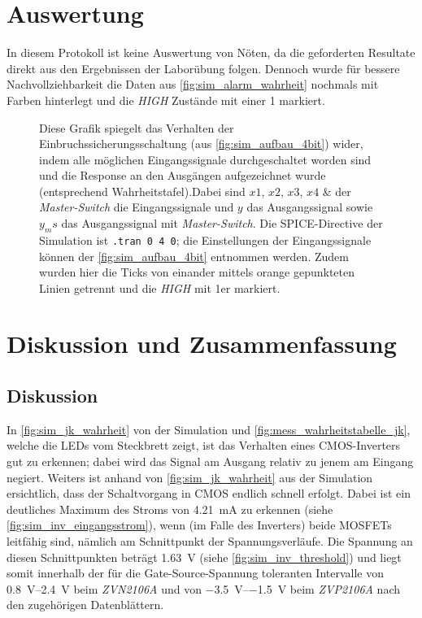 \documentclass[12pt,english,ngerman]{scrartcl}
\begin{document}
\section{Auswertung}\label{sec:Auswertung}
In diesem Protokoll ist keine Auswertung von Nöten, da die geforderten Resultate
direkt aus den Ergebnissen der Laborübung folgen. Dennoch wurde für bessere 
Nachvollziehbarkeit die Daten aus \autoref{fig:sim_alarm_wahrheit} nochmals mit Farben
hinterlegt und die \textit{HIGH} Zustände mit einer 1 markiert. 

\begin{figure}[H]
  \centering
  \caption{Diese Grafik spiegelt das Verhalten der
    Einbruchssicherungsschaltung (aus \autoref{fig:sim_aufbau_4bit}) wider, indem alle
    möglichen Eingangssignale durchgeschaltet worden sind und die Response an den
    Ausgängen aufgezeichnet wurde (entsprechend Wahrheitstafel).Dabei sind $x1$, $x2$, $x3$, $x4$ \&
    der \textit{Master-Switch} die Eingangssignale und $y$ das Ausgangssignal sowie $y_ms$
    das Ausgangssignal mit \textit{Master-Switch}. Die
    SPICE-Directive der Simulation ist \texttt{.tran 0 4 0}; die
    Einstellungen der Eingangssignale können der \autoref{fig:sim_aufbau_4bit}
  entnommen werden. Zudem wurden hier die Ticks von einander mittels orange gepunkteten Linien getrennt und die \textit{HIGH} mit 1er markiert.}
  \label{fig:sim_alarm_wahrheit_aus}
\end{figure}

\section{Diskussion und Zusammenfassung}\label{sec:Diskussion} 
\subsection{Diskussion}
In \autoref{fig:sim_jk_wahrheit} von der Simulation und
\autoref{fig:mess_wahrheitstabelle_jk}, welche die LEDs vom Steckbrett zeigt,
ist das Verhalten eines CMOS-Inverters gut zu erkennen; dabei wird das Signal
am Ausgang relativ zu jenem am Eingang negiert.
Weiters ist anhand von \autoref{fig:sim_jk_wahrheit} aus der Simulation ersichtlich, dass
der Schaltvorgang in CMOS endlich schnell erfolgt. Dabei ist ein deutliches
Maximum des Stroms von \SI{4,21}{\milli \ampere} zu erkennen (siehe \autoref{fig:sim_inv_eingangsstrom}), 
wenn (im Falle des Inverters) beide MOSFETs
leitfähig sind, nämlich am Schnittpunkt der Spannungsverläufe.
Die Spannung an diesen Schnittpunkten beträgt \SI{1,63}{\volt} 
(siehe \autoref{fig:sim_inv_threshold}) und liegt
somit innerhalb der für die Gate-Source-Spannung toleranten Intervalle
von \SIrange{0.8}{2.4}{\volt} beim \textit{ZVN2106A} und von
\SIrange{-3.5}{-1.5}{\volt} beim \textit{ZVP2106A} nach den zugehörigen Datenblättern.
\end{document}
